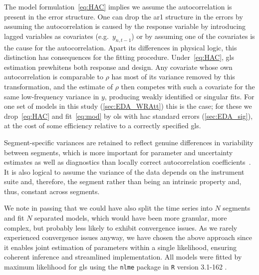 The model formulation~\eqref{eq:HAC} implies we assume the autocorrelation is present in the error structure. One can drop the \gls{ar1} structure in the errors by assuming the autocorrelation is caused by the response variable by introducing lagged variables as covariates (e.g.~$y_{n,t-1}$) or by assuming one of the covariates is the cause for the autocorrelation. Apart its differences in physical logic, this distinction has consequences for the fitting procedure. Under~\eqref{eq:HAC}, \gls{gls} estimation prewhitens both response and design. Any covariate whose own autocorrelation is comparable to $\rho$ has most of its variance removed by this transformation, and the estimate of $\rho$ then competes with such a covariate for the same low-frequency variance in $y$, producing weakly identified or singular fits. For one set of models in this study (\cref{sec:EDA_WRAtt}) this is the case; for these we drop~\eqref{eq:HAC} and fit~\eqref{eq:mod} by \gls{ols} with \gls{hac} standard errors (\cref{sec:EDA_sig}), at the cost of some efficiency relative to a correctly specified \gls{gls}.

Segment-specific variances are retained to reflect genuine differences in variability between segments, which is more important for parameter and uncertainty estimates as well as diagnostics than locally correct autocorrelation coefficients~\parencite{hamiltonTimeSeriesAnalysis1994}. It is also logical to assume the variance of the data depends on the instrument suite and, therefore, the segment rather than being an intrinsic property and, thus, constant across segments.

We note in passing that we could have also split the time series into $N$ segments and fit $N$ separated models, which would have been more granular, more complex, but probably less likely to exhibit convergence issues. As we rarely experienced convergence issues anyway, we have chosen the above approach since it enables joint estimation of parameters within a single likelihood, ensuring coherent inference and streamlined implementation. All models were fitted by maximum likelihood for \gls{gls} using the \texttt{nlme} package in \texttt{R} \parencite{pinheiroMixedeffectsModelsSPLUS2000} version 3.1-162 \parencite{pinheiroNlmeLinearNonlinear2025}.


